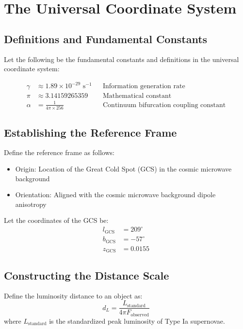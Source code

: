 \documentclass{article}
\begin{document}
\section*{The Universal Coordinate System}

\subsection*{Definitions and Fundamental Constants}

Let the following be the fundamental constants and definitions in the universal coordinate system:

\begin{align}
\gamma &\approx 1.89 \times 10^{-29} \text{ s}^{-1} && \text{Information generation rate} \\
\pi &\approx 3.14159265359 && \text{Mathematical constant} \\
\alpha &= \frac{1}{4\pi \times 256} && \text{Continuum bifurcation coupling constant}
\end{align}

\subsection*{Establishing the Reference Frame}

Define the reference frame as follows:

\begin{itemize}
    \item Origin: Location of the Great Cold Spot (GCS) in the cosmic microwave background
    \item Orientation: Aligned with the cosmic microwave background dipole anisotropy
\end{itemize}

Let the coordinates of the GCS be:
\begin{align}
l_\text{GCS} &= 209^\circ \\
b_\text{GCS} &= -57^\circ \\
z_\text{GCS} &= 0.0155
\end{align}

\subsection*{Constructing the Distance Scale}

Define the luminosity distance to an object as:
\begin{equation}
d_L = \frac{L_\text{standard}}{4\pi F_\text{observed}}
\end{equation}
where $L_\text{standard}$ is the standardized peak luminosity of Type Ia supernovae.
\end{document}
